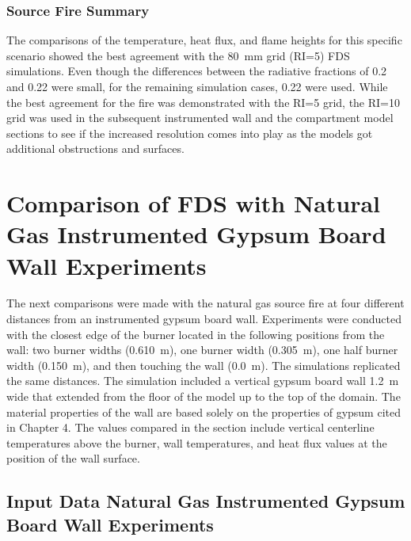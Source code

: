 \documentclass[twoside]{uocthesis}
\begin{document}
{\subsubsection{Source Fire Summary}

The comparisons of the temperature, heat flux, and flame heights for this specific scenario showed the best agreement with the 80~mm grid (RI=5) FDS simulations.  Even though the differences between the radiative fractions of 0.2 and 0.22 were small, for the remaining simulation cases, 0.22 were used.  While the best agreement for the fire was demonstrated with the RI=5 grid, the RI=10 grid was used in the subsequent instrumented wall and the compartment model sections to see if the increased resolution comes into play as the models got additional obstructions and surfaces.  

\section{Comparison of FDS with Natural Gas Instrumented Gypsum Board Wall Experiments}

The next comparisons were made with the natural gas source fire at four different distances from an instrumented gypsum board wall.  Experiments were conducted with the closest edge of the burner located in the following positions from the wall: two burner widths (0.610~m), one burner width (0.305~m), one half burner width (0.150~m), and then touching the wall (0.0~m).  The simulations replicated the same distances.  The simulation included a vertical gypsum board wall 1.2~m wide that extended from the floor of the model up to the top of the domain.  The material properties of the wall are based solely on the properties of gypsum cited in Chapter 4.  The values compared in the section include vertical centerline temperatures above the burner, wall temperatures, and heat flux values at the position of the wall surface.    
 
\subsection{Input Data Natural Gas Instrumented Gypsum Board Wall Experiments}

}
\end{document}
